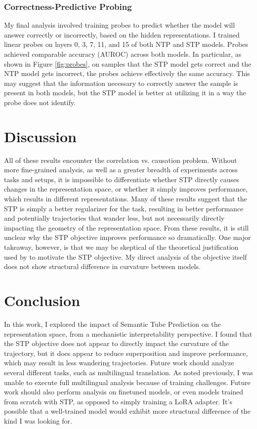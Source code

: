 \documentclass[11pt]{article}
\begin{document}
\subsubsection{Correctness-Predictive Probing}

My final analysis involved training probes to predict whether the model will answer correctly or incorrectly, based on the hidden representations. I trained linear probes on layers 0, 3, 7, 11, and 15 of both NTP and STP models. Probes achieved comparable accuracy (AUROC) across both models. In particular, as shown in Figure \ref{fig:probes}, on samples that the STP model gets correct and the NTP model gets incorrect, the probes achieve effectively the same accuracy. This may suggest that the information necessary to correctly answer the sample is present in both models, but the STP model is better at utilizing it in a way the probe does not identify.

\section{Discussion}

All of these results encounter the correlation vs. causation problem. Without more fine-grained analysis, as well as a greater breadth of experiments across tasks and setups, it is impossible to differentiate whether STP directly causes changes in the representation space, or whether it simply improves performance, which results in different representations. Many of these results suggest that the STP is simply a better regularizer for the task, resulting in better performance and potentially trajectories that wander less, but not necessarily directly impacting the geometry of the representation space. From these results, it is still unclear why the STP objective improves performance so dramatically. One major takeaway, however, is that we may be skeptical of the theoretical justification used by \citet{stp} to motivate the STP objective. My direct analysis of the objective itself does not show structural difference in curvature between models.

\section{Conclusion}

In this work, I explored the impact of Semantic Tube Prediction on the representation space, from a mechanistic interpretability perspective. I found that the STP objective does not appear to directly impact the curvature of the trajectory, but it does appear to reduce superposition and improve performance, which may result in less wandering trajectories. Future work should analyze several different tasks, such as multilingual translation. As noted previously, I was unable to execute full multilingual analysis because of training challenges. Future work should also perform analysis on finetuned models, or even models trained from scratch with STP, as opposed to simply training a LoRA adapter. It's possible that a well-trained model would exhibit more structural difference of the kind I was looking for.
%

\end{document}
